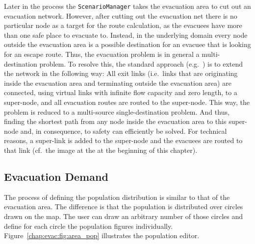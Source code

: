 Later in the process the \verb+ScenarioManager+ takes the evacuation area to cut out an evacuation network. However, after cutting out the evacuation net there is no particular node as a target for the route 
calculation, as the evacuees have more than one safe place to evacuate to. Instead,
in the underlying domain every node outside the evacuation area is a possible
destination for an evacuee that is looking for an escape route. Thus, the evacuation problem is in general a multi-destination problem. To resolve this,
the standard approach (e.g.~\citet{FordFulkerson1962FlowsInNetworks,LuGeorgeEtAl2005CapacityConstrainedRouting})
is to extend the network in the following way: All exit links (i.e.\ links that are originating inside the evacuation area and terminating outside the evacuation area) are connected, using virtual links with infinite flow capacity
and zero length, to a super-node, and all evacuation routes are routed to the super-node. This way, the problem is reduced to a multi-source single-destination problem. And thus, finding the shortest path from any node inside the evacuation area to this super-node and, in consequence, to safety can efficiently be solved. For technical reasons, a super-link is added to the super-node and the evacuees are routed to that link (cf.\ the image at the at the beginning of this chapter).


\subsection{Evacuation Demand}
The process of defining the population distribution is similar to that of the evacuation area. 
The difference is that the population is distributed over circles drawn on the map. 
The user can draw an arbitrary number of those circles and define for each circle the population figures individually. Figure~\ref{chap:evac:fig:area_pop} illustrates the population editor. 


